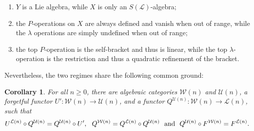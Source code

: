 \documentclass[11pt]{amsart} \renewcommand{\baselinestretch}{1.2}
\theoremstyle{plain}
\newtheorem{cor}[thm]{Corollary}
\numberwithin{equation}{section} %
\theoremstyle{plain}
\newtheorem{cor}[thm]{Corollary}
\numberwithin{equation}{chapter} %
\renewcommand{\to}{\longrightarrow}
\newcommand{\squishlist}{
}
\newcommand{\scrL}{\mathscr{L}}
\newcommand{\calU}{\mathcal{U}}
\newcommand{\calL}{\mathcal{L}}
\newcommand{\calw}{\mathcal{W}}
\newcommand{\calu}{\mathcal{U}}
\newcommand{\call}{\mathcal{L}}
\newcommand{\LieOperad}{{\scrL}}
\begin{document}
\begin{homotopy operations for PRLs}
\begin{enumerate}\squishlist
\item $Y$ is a  Lie algebra, while $X$ is only an $S(\LieOperad)$-algebra;
\item the $P$-operations on $X$ are always defined and vanish when out of range, while the $\lambda$ operations are simply undefined when out of range;
\item the top $P$-operation is the self-bracket and thus is linear, while the top $\lambda$-operation is the restriction and thus a quadratic refinement of the bracket.
\end{enumerate}
Nevertheless, the two regimes share the following common ground:
\begin{cor}
\label{indec functors common ground 0 and n}
For all $n\geq0$, there are algebraic categories $\calw(n)$ and $\calU(n)$, a forgetful functor $U':\calw(n)\to\calU(n)$, and a functor $Q^{\calU(n)}:\calw(n)\to \calL(n)$, such that
\[U^{\call(n)}\circ Q^{\calu(n)}=Q^{\calu(n)}\circ  U',\ \ Q^{\calw(n)}=Q^{\calL(n)}\circ Q^{\calU(n)}\textup{\ \ and\ \ }Q^{\calU(n)}\circ F^{\calw(n)}=F^{\calL(n)}.\]
\end{cor}



\end{homotopy operations for PRLs}
\end{document}
